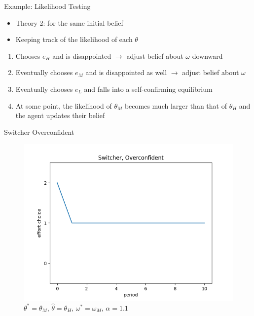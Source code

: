 \documentclass[aspectratio=169]{beamer}
\begin{document}
\begin{frame}{Example: Likelihood Testing}
\begin{itemize}
    \item Theory 2: for the same initial belief
    \item Keeping track of the likelihood of each $\theta$
    \end{itemize}
    \bigskip
    \begin{enumerate}
        \item Chooses $e_H$ and is disappointed $\rightarrow$ adjust belief about $\omega$ downward\\
        \bigskip
        \item Eventually chooses $e_M$ and is disappointed as well $\rightarrow$ adjust belief about $\omega$\\
        \bigskip
        \item Eventually chooses $e_L$ and falls into a self-confirming equilibrium\\
        \bigskip
        \item At some point, the likelihood of $\theta_M$ becomes much larger than that of $\theta_H$ and the agent updates their belief
    \end{enumerate}
    
    
\end{frame}

\begin{frame}{Switcher Overconfident}
    \begin{figure}
        \centering
        \includegraphics[scale=.5]{figures2/switcher_over_11.png}
        \caption{$\theta^*=\theta_M$, $\hat\theta=\theta_H$, $\omega^*=\omega_M$, $\alpha= 1.1$}
    \end{figure}
\end{frame}
\end{document}
